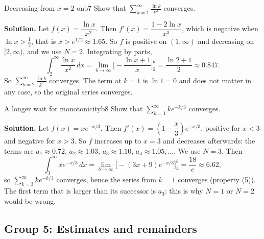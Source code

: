\documentclass[11pt]{article}
\begin{document}
\begin{exmp}{Decreasing from $x=2$ on}{b7}
Show that $\displaystyle\sum_{k=1}^\infty\frac{\ln k}{k^2}$ converges.

\textbf{Solution.} Let $f(x)=\dfrac{\ln x}{x^2}$. Then $f'(x)=\dfrac{1-2\ln x}{x^3}$, which is negative when $\ln x>\frac12$, that is $x>e^{1/2}\approx1.65$. So $f$ is positive on $(1,\infty)$ and decreasing on $[2,\infty)$, and we use $N=2$. Integrating by parts,
\[
\int_2^\infty\frac{\ln x}{x^2}\,dx=\lim_{b\to\infty}\Big[-\frac{\ln x+1}x\Big]_2^b=\frac{\ln2+1}2\approx0.847 .
\]
So $\sum_{k=2}^\infty\frac{\ln k}{k^2}$ converges. The term at $k=1$ is $\ln1=0$ and does not matter in any case, so the original series converges.
\end{exmp}

\begin{exmp}{A longer wait for monotonicity}{b8}
Show that $\displaystyle\sum_{k=1}^\infty ke^{-k/3}$ converges.

\textbf{Solution.} Let $f(x)=xe^{-x/3}$. Then $f'(x)=\left(1-\dfrac x3\right)e^{-x/3}$, positive for $x<3$ and negative for $x>3$. So $f$ increases up to $x=3$ and decreases afterwards: the terms are $a_1\approx0.72$, $a_2\approx1.03$, $a_3\approx1.10$, $a_4\approx1.05,\dots$. We use $N=3$. Then
\[
\int_3^\infty xe^{-x/3}\,dx=\lim_{b\to\infty}\Big[-(3x+9)e^{-x/3}\Big]_3^b=\frac{18}e\approx6.62 ,
\]
so $\sum_{k=3}^\infty ke^{-k/3}$ converges, hence the series from $k=1$ converges (property (5)). The first term that is larger than its successor is $a_3$: this is why $N=1$ or $N=2$ would be wrong.
\end{exmp}

\subsection*{Group 5: Estimates and remainders}
\end{document}
